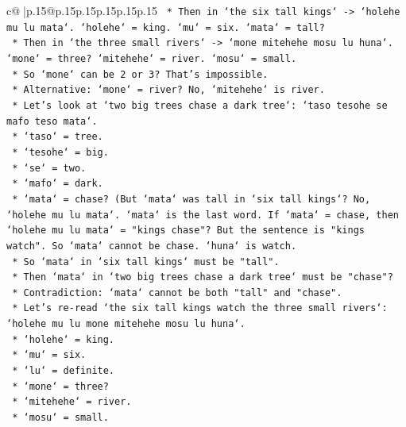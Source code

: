 \documentclass{article}
\begin{document}
{\begin{supertabular}{c@{$\;$}|p{.15\linewidth}@{}p{.15\linewidth}p{.15\linewidth}p{.15\linewidth}p{.15\linewidth}p{.15\linewidth}}
{{{\texttt{                    *   Then in `the six tall kings` {-}> `holehe mu lu mata`. `holehe` = king. `mu` = six. `mata` = tall?} \\
\texttt{                    *   Then in `the three small rivers` {-}> `mone mitehehe mosu lu huna`. `mone` = three? `mitehehe` = river. `mosu` = small.} \\
\texttt{                    *   So `mone` can be 2 or 3? That's impossible.} \\
\texttt{                    *   Alternative: `mone` = river? No, `mitehehe` is river.} \\
\texttt{                    *   Let's look at `two big trees chase a dark tree`: `taso tesohe se mafo teso mata`.} \\
\texttt{                        *   `taso` = tree.} \\
\texttt{                        *   `tesohe` = big.} \\
\texttt{                        *   `se` = two.} \\
\texttt{                        *   `mafo` = dark.} \\
\texttt{                        *   `mata` = chase? (But `mata` was tall in `six tall kings`? No, `holehe mu lu mata`. `mata` is the last word. If `mata` = chase, then `holehe mu lu mata` = "kings chase"? But the sentence is "kings watch". So `mata` cannot be chase. `huna` is watch.} \\
\texttt{                        *   So `mata` in `six tall kings` must be "tall".} \\
\texttt{                        *   Then `mata` in `two big trees chase a dark tree` must be "chase"?} \\
\texttt{                        *   Contradiction: `mata` cannot be both "tall" and "chase".} \\
\texttt{                        *   Let's re{-}read `the six tall kings watch the three small rivers`: `holehe mu lu mone mitehehe mosu lu huna`.} \\
\texttt{                            *   `holehe` = king.} \\
\texttt{                            *   `mu` = six.} \\
\texttt{                            *   `lu` = definite.} \\
\texttt{                            *   `mone` = three?} \\
\texttt{                            *   `mitehehe` = river.} \\
\texttt{                            *   `mosu` = small.} \\
}}}
\end{supertabular}}
\end{document}
